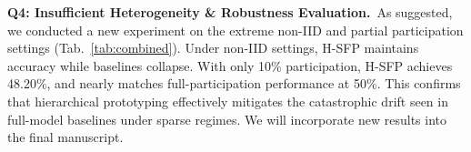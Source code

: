 \documentclass[10pt,twocolumn,letterpaper]{article}
\begin{document}

\noindent\textbf{Q4: Insufficient Heterogeneity \& Robustness Evaluation.}~As suggested, we conducted a new experiment on the extreme non-IID and partial participation settings (Tab.~\ref{tab:combined}). Under non-IID settings, H-SFP maintains accuracy while baselines collapse. With only 10\% participation, H-SFP achieves 48.20\%, and nearly matches full-participation performance at 50\%. This confirms that hierarchical prototyping effectively mitigates the catastrophic drift seen in full-model baselines under sparse regimes. 
We will incorporate new results into the final manuscript.
\end{document}
